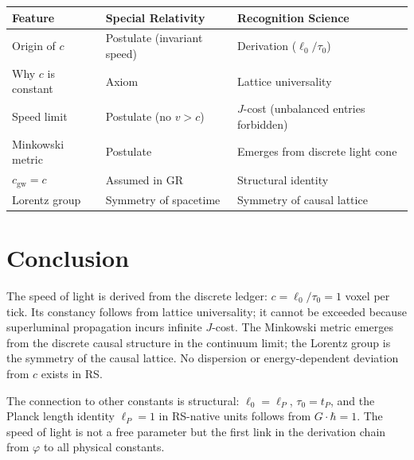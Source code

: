 \documentclass[12pt,a4paper]{article}
\theoremstyle{definition}
\theoremstyle{remark}
\begin{document}
\begin{center}
\renewcommand{\arraystretch}{1.3}
\begin{tabular}{p{3.2cm}p{5.5cm}p{5.5cm}}
\toprule
\textbf{Feature} & \textbf{Special Relativity} & \textbf{Recognition Science} \\
\midrule
Origin of $c$ & Postulate (invariant speed) & Derivation ($\ell_0/\tau_0$) \\
Why $c$ is constant & Axiom & Lattice universality \\
Speed limit & Postulate (no $v > c$) & $J$-cost (unbalanced entries forbidden) \\
Minkowski metric & Postulate & Emerges from discrete light cone \\
$c_{\mathrm{gw}} = c$ & Assumed in GR & Structural identity \\
Lorentz group & Symmetry of spacetime & Symmetry of causal lattice \\
\bottomrule
\end{tabular}
\end{center}

\section{Conclusion}

The speed of light is derived from the discrete ledger:
$c = \ell_0/\tau_0 = 1$ voxel per tick.  Its constancy follows
from lattice universality; it cannot be exceeded because
superluminal propagation incurs infinite $J$-cost.  The Minkowski
metric emerges from the discrete causal structure in the continuum
limit; the Lorentz group is the symmetry of the causal lattice.
No dispersion or energy-dependent deviation from $c$ exists in RS.

The connection to other constants is structural: $\ell_0 = \ell_P$,
$\tau_0 = t_P$, and the Planck length identity $\ell_P = 1$ in
RS-native units follows from $G \cdot \hbar = 1$.  The speed of
light is not a free parameter but the first link in the derivation
chain from $\varphi$ to all physical constants.
\end{document}
